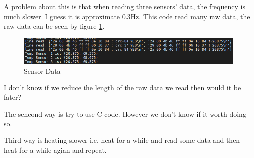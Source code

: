 \documentclass{article}
\begin{document}
A problem about this is that when reading three sensors' data, the frequency is much slower, I guess it is approximate 0.3Hz. This code read many raw data, the raw data can be seen by figure \ref{fig:sensordata}.
\begin{figure}
\begin{center}
\includegraphics[scale=0.8]{sensorRawData.png}
\end{center}
\caption{Sensor Data}
\label{fig:sensordata}
\end{figure}

I don't know if we reduce the length of the raw data we read then would it be fater?  

The sencond way is try to use C code. However we don't know if it worth doing so.

Third way is heating slower i.e. heat for a while and read some data and then heat for a while agian and repeat. 
\end{document}
